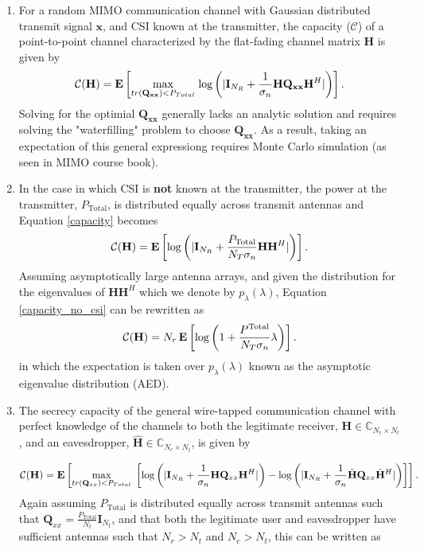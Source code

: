 \documentclass[12pt,a4paper]{report}
\begin{document}
\begin{enumerate}
\item For a random MIMO communication channel with Gaussian distributed transmit signal $\mathbf{x}$, and CSI known at the transmitter,  the capacity ($\mathcal{C}$) of a point-to-point channel characterized by the flat-fading channel matrix $\mathbf{H}$ is given by
\begin{equation}\label{capacity}
\mathcal{C{}}{(\mathbf{H})} = \mathop{\bf E{}}\left[\underset{tr(\mathbf{Q}_{\mathbf{xx}}) < P_{Total}}{\mathrm{max}} \;\text{log{}}\left(|\mathbf{I}_{N_R}+\frac{1}{\sigma_n}\mathbf{H}\mathbf{Q}_{\mathbf{xx}}\mathbf{H}^H|\right)\right].
\end{equation}
Solving for the optimial $\mathbf{Q}_{\mathbf{xx}}$ generally lacks an analytic solution and requires solving the  "waterfilling" problem to choose $\mathbf{Q}_{\mathbf{xx}}$. As a result, taking an expectation of this general expressiong requires Monte Carlo simulation (as seen in MIMO course book).

\item
In the case in which CSI is \textbf{not} known at the transmitter, the power at the transmitter, $P_{\text{Total}}$, is distributed equally across transmit antennas and Equation \ref{capacity} becomes
\begin{equation}\label{capacity_no_csi}
\mathcal{C{}}{(\mathbf{H})} = \mathop{\bf E{}}\left[\text{log{}}\left(|\mathbf{I}_{N_R}+\frac{P_{\text{Total}}}{N_T \sigma_n}\mathbf{H}\mathbf{H}^H|\right)\right].
\end{equation} 
Assuming asymptotically large antenna arrays, and given the distribution for the eigenvalues of $\mathbf{H}\mathbf{H}^H$ which we denote by $p_{\lambda}(\lambda)$, Equation \ref{capacity_no_csi} can be rewritten as 
\begin{equation}\label{capacity_AED}
\mathcal{C{}}{(\mathbf{H})} = N_r \mathop{\bf E{}}\left[\text{log{}}\left(1+\frac{P^{\text{Total}}}{N_T \sigma_n}\lambda\right)\right].
\end{equation}
 in which the expectation is taken over $p_{\lambda}(\lambda)$ known as the asymptotic eigenvalue distribution (AED).

\item The secrecy capacity of the general wire-tapped communication channel with perfect knowledge of the channels to both the legitimate receiver, $\mathbf{H} \in \mathbb{C}_{N_r \times N_t}$, and an eavesdropper, $\hat{\mathbf{H}}\in \mathbb{C}_{N_e \times N_t}$, is given by 

\begin{gather}\label{secrecy_capacity}
\mathcal{C{}}{(\mathbf{H})} = \mathop{\bf E{}}\left[\underset{tr({\mathbf{Q}_{xx}}) < P_{Total}}{\mathrm{max}} \;\left[\text{log{}}\left(|\mathbf{I}_{N_R}+\frac{1}{\sigma_n}\mathbf{H}\mathbf{Q}_{xx}\mathbf{H}^H|\right) -
\text{log{}}\left(|\mathbf{I}_{N_R}+\frac{1}{\sigma_n}\hat{\mathbf{H}}\mathbf{Q}_{xx}\hat{\mathbf{H}}^H|\right)
\right] \right].
\end{gather}
Again assuming $P_{\text{Total}}$ is distributed equally across transmit antennas such that $\mathbf{Q}_{xx} = \frac{P_{\text{Total}}}{N_t}\mathbf{I}_{N_t}$, and that both the legitimate user and eavesdropper have sufficient antennas such that $N_r > N_t$ and $N_e >N_t$,  this can be written as 


\end{enumerate}
\end{document}
